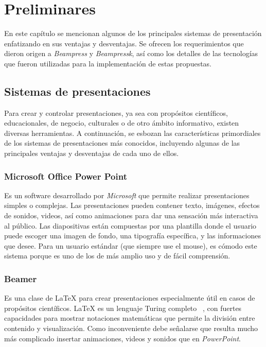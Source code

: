 \chapter{Preliminares} %
\label{cha:preliminares}

	En este capítulo se mencionan algunos de los principales sistemas de presentación enfatizando en sus ventajas y desventajas. Se ofrecen los requerimientos que dieron origen a \textit{Beampress} y \textit{Beampressk}, así como los detalles de las tecnologías que fueron utilizadas para la implementación de estas propuestas.	

	\section{Sistemas de presentaciones} %
	\label{sec:sistemas_de_presentaciones}
		Para crear y controlar presentaciones, ya sea con propósitos científicos, educacionales, de negocio, culturales o de otro ámbito informativo, existen diversas herramientas. A continuación, se esbozan las características primordiales de los sistemas de presentaciones más conocidos, incluyendo algunas de las principales ventajas y desventajas de cada uno de ellos.	
		\subsection{Microsoft Office Power Point} %
		\label{sub:microsoft_office_power_point}

			Es un software desarrollado por \textit{Microsoft}  que permite realizar presentaciones simples o complejas. Las presentaciones pueden contener texto, imágenes, efectos de sonidos, videos, así como animaciones para dar una sensación más interactiva al público. Las diapositivas están compuestas por una plantilla donde el usuario puede escoger una imagen de fondo, una tipografía específica, y las informaciones que desee. Para un usuario estándar (que siempre use el mouse), es cómodo este sistema porque es uno de los de más amplio uso y de fácil comprensión. 


		\subsection{Beamer} %
		\label{sub:beamer}

			Es una clase de \LaTeX{} para crear presentaciones especialmente útil en casos de propósitos científicos. \LaTeX{} es un lenguaje Turing completo ~\cite{turing}, con fuertes capacidades para mostrar notaciones matemáticas que permite la división entre contenido y visualización. Como inconveniente debe señalarse que resulta mucho más complicado insertar animaciones, videos y sonidos que en \textit{PowerPoint}.

